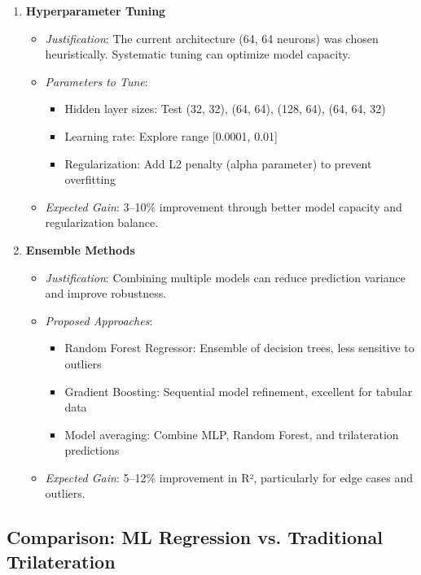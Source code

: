 \begin{enumerate}
    \item \textbf{Hyperparameter Tuning}
    \begin{itemize}
        \item \textit{Justification}: The current architecture (64, 64 neurons) was chosen heuristically. Systematic tuning can optimize model capacity.
        \item \textit{Parameters to Tune}:
        \begin{itemize}
            \item Hidden layer sizes: Test (32, 32), (64, 64), (128, 64), (64, 64, 32)
            \item Learning rate: Explore range [0.0001, 0.01]
            \item Regularization: Add L2 penalty (alpha parameter) to prevent overfitting
        \end{itemize}
        \item \textit{Expected Gain}: 3--10\% improvement through better model capacity and regularization balance.
    \end{itemize}
    
    \item \textbf{Ensemble Methods}
    \begin{itemize}
        \item \textit{Justification}: Combining multiple models can reduce prediction variance and improve robustness.
        \item \textit{Proposed Approaches}:
        \begin{itemize}
            \item Random Forest Regressor: Ensemble of decision trees, less sensitive to outliers
            \item Gradient Boosting: Sequential model refinement, excellent for tabular data
            \item Model averaging: Combine MLP, Random Forest, and trilateration predictions
        \end{itemize}
        \item \textit{Expected Gain}: 5--12\% improvement in R², particularly for edge cases and outliers.
    \end{itemize}
\end{enumerate}

\subsection{Comparison: ML Regression vs. Traditional Trilateration}

